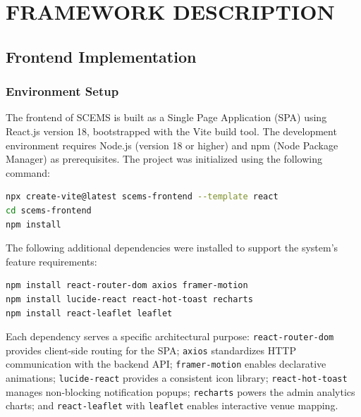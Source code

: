 
\chapter{FRAMEWORK DESCRIPTION}

\section{Frontend Implementation}

\subsection{Environment Setup}
The frontend of SCEMS is built as a Single Page Application (SPA) using React.js version 18, bootstrapped with the Vite build tool. The development environment requires Node.js (version 18 or higher) and npm (Node Package Manager) as prerequisites. The project was initialized using the following command:

\begin{lstlisting}[language=bash, caption={Frontend Project Initialization}]
npx create-vite@latest scems-frontend --template react
cd scems-frontend
npm install
\end{lstlisting}

The following additional dependencies were installed to support the system's feature requirements:

\begin{lstlisting}[language=bash, caption={Frontend Dependency Installation}]
npm install react-router-dom axios framer-motion
npm install lucide-react react-hot-toast recharts
npm install react-leaflet leaflet
\end{lstlisting}

Each dependency serves a specific architectural purpose: \texttt{react-router-dom} provides client-side routing for the SPA; \texttt{axios} standardizes HTTP communication with the backend API; \texttt{framer-motion} enables declarative animations; \texttt{lucide-react} provides a consistent icon library; \texttt{react-hot-toast} manages non-blocking notification popups; \texttt{recharts} powers the admin analytics charts; and \texttt{react-leaflet} with \texttt{leaflet} enables interactive venue mapping.

